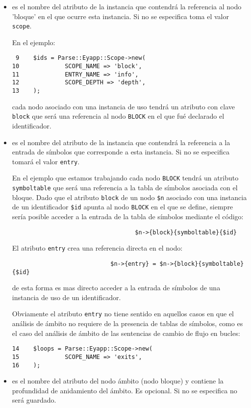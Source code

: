 \begin{itemize}
\item
{} es el nombre del atributo de la instancia 
que contendrá la referencia al nodo
'bloque' en el que ocurre esta instancia. Si no se especifica toma el valor \verb|scope|.

En el ejemplo:

\begin{verbatim}
 9    $ids = Parse::Eyapp::Scope->new(
10             SCOPE_NAME => 'block',
11             ENTRY_NAME => 'info',
12             SCOPE_DEPTH => 'depth',
13    );
\end{verbatim}

cada nodo asociado con una instancia de uso tendrá un atributo con clave \verb|block|
que será una referencia al nodo \verb|BLOCK| en el que fué declarado el identificador.

\item
{} es el nombre del atributo de la instancia
que contendrá la referencia a 
la entrada de símbolos que corresponde a esta instancia. Si no se
especifica tomará el valor \verb|entry|.

En el ejemplo que estamos trabajando cada nodo \verb|BLOCK| tendrá un atributo
\verb|symboltable| que será una referencia a la tabla de símbolos asociada con el bloque.
Dado que el atributo \verb|block| de un nodo \verb|$n| asociado 
con una instancia de un identificador \verb|$id| apunta
al nodo \verb|BLOCK| en el que se define, siempre sería posible
acceder a la entrada de la tabla de símbolos mediante el código: 
\begin{verbatim}
                                   $n->{block}{symboltable}{$id}
\end{verbatim}
El atributo \verb|entry| crea una referencia directa en el nodo:
\begin{verbatim}
                            $n->{entry} = $n->{block}{symboltable}{$id}
\end{verbatim}
de esta forma es mas directo acceder a la entrada de símbolos de una instancia
de uso de un identificador.

Obviamente el atributo \verb|entry| no tiene sentido
en aquellos casos en que el análisis de ámbito no requiere
de la presencia de tablas de símbolos, como es el caso del
análisis de ámbito de las sentencias de cambio de flujo en
bucles: 
\begin{verbatim}
14    $loops = Parse::Eyapp::Scope->new(
15             SCOPE_NAME => 'exits',
16    );
\end{verbatim}
\item
{} es el nombre del atributo del nodo ámbito (nodo bloque)
y contiene la profundidad de anidamiento del ámbito. Es opcional. Si no
se especifica no será guardado.
\end{itemize}


